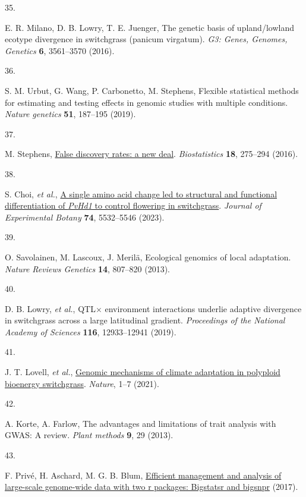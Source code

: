 \documentclass[
  9pt,
  twocolumn,
  twoside]{pnas-new}
\newlength{\cslhangindent}
\newlength{\csllabelwidth}
\newenvironment{CSLReferences}[2] %
 {\begin{list}{}{%
  \setlength{\itemindent}{0pt}
  \setlength{\leftmargin}{0pt}
  \setlength{\parsep}{0pt}
  \ifodd #1
   \setlength{\leftmargin}{\cslhangindent}
   \setlength{\itemindent}{-1\cslhangindent}
  \fi
  \setlength{\itemsep}{#2\baselineskip}}}
 {\end{list}}
\newcommand{\CSLLeftMargin}[1]{\parbox[t]{\csllabelwidth}{\strut#1\strut}}
\newcommand{\CSLRightInline}[1]{\parbox[t]{\linewidth - \csllabelwidth}{\strut#1\strut}}
\begin{document}
\begin{CSLReferences}{0}{1}
\CSLLeftMargin{35. }%
\CSLRightInline{E. R. Milano, D. B. Lowry, T. E. Juenger, The genetic
basis of upland/lowland ecotype divergence in switchgrass (panicum
virgatum). \emph{G3: Genes, Genomes, Genetics} \textbf{6}, 3561--3570
(2016).}

\CSLLeftMargin{36. }%
\CSLRightInline{S. M. Urbut, G. Wang, P. Carbonetto, M. Stephens,
Flexible statistical methods for estimating and testing effects in
genomic studies with multiple conditions. \emph{Nature genetics}
\textbf{51}, 187--195 (2019).}

\CSLLeftMargin{37. }%
\CSLRightInline{M. Stephens,
\href{https://doi.org/10.1093/biostatistics/kxw041}{{False discovery
rates: a new deal}}. \emph{Biostatistics} \textbf{18}, 275--294 (2016).}

\CSLLeftMargin{38. }%
\CSLRightInline{S. Choi, \emph{et al.},
\href{https://doi.org/10.1093/jxb/erad255}{A single amino acid change
led to structural and functional differentiation of {\emph{PvHd1}} to
control flowering in switchgrass}. \emph{Journal of Experimental Botany}
\textbf{74}, 5532--5546 (2023).}

\CSLLeftMargin{39. }%
\CSLRightInline{O. Savolainen, M. Lascoux, J. Merilä, Ecological
genomics of local adaptation. \emph{Nature Reviews Genetics}
\textbf{14}, 807--820 (2013).}

\CSLLeftMargin{40. }%
\CSLRightInline{D. B. Lowry, \emph{et al.}, QTL\(\times\) environment
interactions underlie adaptive divergence in switchgrass across a large
latitudinal gradient. \emph{Proceedings of the National Academy of
Sciences} \textbf{116}, 12933--12941 (2019).}

\CSLLeftMargin{41. }%
\CSLRightInline{J. T. Lovell, \emph{et al.},
\href{https://doi.org/10.1038/s41586-020-03127-1}{Genomic mechanisms of
climate adaptation in polyploid bioenergy switchgrass}. \emph{Nature},
1--7 (2021).}

\CSLLeftMargin{42. }%
\CSLRightInline{A. Korte, A. Farlow, The advantages and limitations of
trait analysis with GWAS: A review. \emph{Plant methods} \textbf{9}, 29
(2013).}

\CSLLeftMargin{43. }%
\CSLRightInline{F. Privé, H. Aschard, M. G. B. Blum,
\href{http://dx.doi.org/10.1101/190926}{Efficient management and
analysis of large-scale genome-wide data with two r packages: Bigstatsr
and bigsnpr} (2017).}

\end{CSLReferences}
\end{document}
